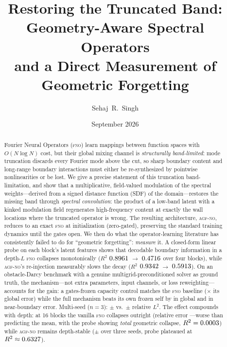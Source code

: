 \documentclass[11pt]{article}
\title{Restoring the Truncated Band: Geometry-Aware Spectral Operators\\
and a Direct Measurement of Geometric Forgetting}
\author{Sehaj~R.~Singh}
\date{September 2026}
\theoremstyle{definition}
\newcommand{\fno}{\textsc{fno}}
\newcommand{\agfno}{\textsc{agf-no}}
\newcommand{\Rtwo}{R^2}
\begin{document}
\maketitle

\begin{abstract}
Fourier Neural Operators (\fno{}) learn mappings between function spaces with
$O(N\log N)$ cost, but their global mixing channel is \emph{structurally
band-limited}: mode truncation discards every Fourier mode above the cut, so
sharp boundary content and long-range boundary interactions must either be
re-synthesized by pointwise nonlinearities or be lost. We give a precise
statement of this truncation band-limitation, and show that a multiplicative,
field-valued modulation of the spectral weights---derived from a signed
distance function (SDF) of the domain---restores the missing band through
\emph{spectral convolution}: the product of a low-band latent with a kinked
modulation field regenerates high-frequency content at exactly the wall
locations where the truncated operator is wrong. The resulting architecture,
\agfno{}, reduces to an exact \fno{} at initialization (zero-gated), preserving
the standard training dynamics until the gates open. We then do what the
operator-learning literature has consistently failed to do for
``geometric forgetting'': \emph{measure} it. A closed-form linear probe on
each block's latent features shows that decodable boundary information in a
depth-$L$ \fno{} collapses monotonically
($\Rtwo$ $0.8961$ $\to$ $0.4716$ over four blocks),
while \agfno{}'s re-injection measurably slows the decay
($\Rtwo$ $0.9342$ $\to$ $0.5913$).
On an obstacle-Darcy benchmark with a genuine multigrid-preconditioned
solver as ground truth, the mechanism---not extra parameters, input channels,
or loss reweighting---accounts for the gain: a gates-frozen capacity control
matches the \fno{} baseline (\CtrlFrozenVsFnoRelL{}$\times$ its global error)
while the full mechanism beats its own frozen self by \MechGainRelLRed{} in
global and \MechGainRingRed{} in near-boundary error. Multi-seed
($n{=}3$): \ExpAgfRelL{}$\pm$\ExpAgfRelLStd{} vs.\
\ExpFnoRelL{}$\pm$\ExpFnoRelLStd{} relative $L^2$. The effect compounds with
depth: at 16 blocks the vanilla \fno{} collapses outright
(relative error \DSixteenFnoRelL{}---worse than predicting the mean, with the
probe showing \emph{total} geometric collapse, $\Rtwo = \ProbeExtFnoDSixteen$)
while \agfno{} remains depth-stable (\SweepDSixteenAgfnoRelL{}$\pm$\SweepDSixteenAgfnoRelLStd{} over three seeds,
probe plateaued at $\Rtwo \approx \ProbeExtAgfDSixteen$).

\end{abstract}
\end{document}

